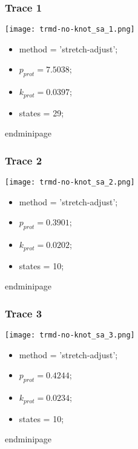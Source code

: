 \begin{minipage}[c]{0.45\textwidth}
\begin{minipage}[c]{0.45\textwidth}
\subsubsection{Trace 1}
\begin{minipage}[c]{0.7\textwidth}
    \texttt{[image: trmd-no-knot\_sa\_1.png]}
\end{minipage}
\hfill
\begin{minipage}[c]{0.45\textwidth}
    \begin{itemize}
        \item method = 'stretch-adjust';
        \item $p_{prot}=7.5038$;
        \item $k_{prot}=0.0397$;
        \item states = 29;
    \end{itemize}
end{minipage}

\subsubsection{Trace 2}
\begin{minipage}[c]{0.7\textwidth}
    \texttt{[image: trmd-no-knot\_sa\_2.png]}
\end{minipage}
\hfill
\begin{minipage}[c]{0.45\textwidth}
    \begin{itemize}
        \item method = 'stretch-adjust';
        \item $p_{prot}=0.3901$;
        \item $k_{prot}=0.0202$;
        \item states = 10;
    \end{itemize}
end{minipage}

\subsubsection{Trace 3}
\begin{minipage}[c]{0.7\textwidth}
    \texttt{[image: trmd-no-knot\_sa\_3.png]}
\end{minipage}
\hfill
\begin{minipage}[c]{0.45\textwidth}
    \begin{itemize}
        \item method = 'stretch-adjust';
        \item $p_{prot}=0.4244$;
        \item $k_{prot}=0.0234$;
        \item states = 10;
    \end{itemize}
end{minipage}


\end{minipage}
\end{minipage}
\end{minipage}
\end{minipage}
\end{minipage}
